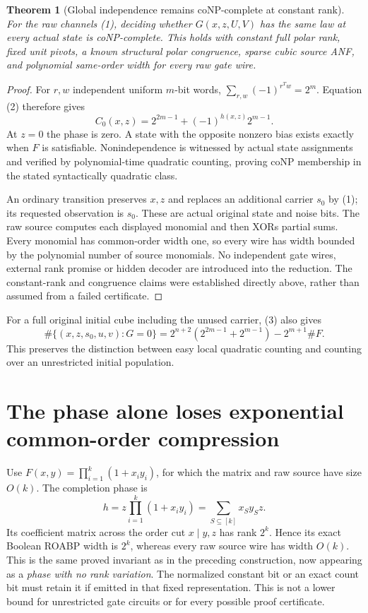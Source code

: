 \documentclass[11pt]{article}
\newtheorem{theorem}{Theorem}
\begin{document}
\begin{theorem}[Global independence remains coNP-complete at constant rank]
For the raw channels (1), deciding whether $G(x,z,U,V)$ has the same law at
every actual state is coNP-complete.  This holds with constant full polar rank,
fixed unit pivots, a known structural polar congruence, sparse cubic source
ANF, and polynomial same-order width for every raw gate wire.
\end{theorem}
\begin{proof}
For $r,w$ independent uniform $m$-bit words,
$\sum_{r,w}(-1)^{r^Tw}=2^m$.  Equation (2) therefore gives
\[
 C_0(x,z)=2^{2m-1}+(-1)^{h(x,z)}2^{m-1}.\tag{3}
\]
At $z=0$ the phase is zero.  A state with the opposite nonzero bias exists
exactly when $F$ is satisfiable.  Nonindependence is witnessed by actual state
assignments and verified by polynomial-time quadratic counting, proving
coNP membership in the stated syntactically quadratic class.

An ordinary transition preserves $x,z$ and replaces an additional carrier $s_0$
by (1); its requested observation is $s_0$.  These are actual original state
and noise bits.  The raw source computes each displayed monomial and then XORs
partial sums.  Every monomial has common-order width one, so every wire has
width bounded by the polynomial number of source monomials.  No independent
gate wires, external rank promise or hidden decoder are introduced into the
reduction.  The constant-rank and congruence claims were established directly
above, rather than assumed from a failed certificate.
\end{proof}

For a full original initial cube including the unused carrier, (3) also gives
\[
 \#\{(x,z,s_0,u,v):G=0\}
 =2^{n+2}(2^{2m-1}+2^{m-1})-2^{m+1}\#F.\tag{4}
\]
This preserves the distinction between easy local quadratic counting and
counting over an unrestricted initial population.

\section{The phase alone loses exponential common-order compression}

Use $F(x,y)=\prod_{i=1}^k(1+x_i y_i)$, for which the matrix and raw source have
size $O(k)$.  The completion phase is
\[
 h=z\prod_{i=1}^k(1+x_i y_i)=\sum_{S\subseteq[k]}x_S y_Sz.
\]
Its coefficient matrix across the order cut $x\mid y,z$ has rank $2^k$.
Hence its exact Boolean ROABP width is $2^k$, whereas every raw source wire
has width $O(k)$.  This is the same proved invariant as in the preceding
construction, now appearing as a \emph{phase with no rank variation}.
The normalized constant bit or an exact count bit must retain it if emitted
in that fixed representation.  This is not a lower bound for unrestricted
gate circuits or for every possible proof certificate.
\end{document}
